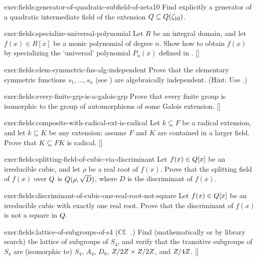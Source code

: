 \begin{exer}{}{exer:fields:generator-of-quadratic-subfield-of-zeta10}
  Find explicitly a generator of a quadratic intermediate field of the
  extension $Q \subseteq Q(\zeta_{10})$.
\end{exer}
\begin{exer}{}{exer:fields:specialize-universal-polynomial}
  Let $R$ be an integral domain, and let $f(x) \in R[x]$ be a monic
  polynomial of degree $n$. Show how to obtain $f(x)$ by specializing
  the `universal' polynomial $P_n(x)$ defined in
  . []
\end{exer}
\begin{exer}{}{exer:fields:elem-symmetric-fns-alg-independent}
  Prove that the elementary symmetric functions $s_1, \dots, s_n$ (see
  )
  are algebraically independent. (Hint: Use
  .)
\end{exer}
\begin{exer}{}{exer:fields:every-finite-grp-is-a-galois-grp}
  Prove that every finite group is isomorphic to the group of
  automorphisms of some Galois
  extension. []
\end{exer}
\begin{exer}{}{exer:fields:composite-with-radical-ext-is-radical}
  Let $k \subseteq F$ be a radical extension, and let $k \subseteq K$
  be any extension; assume $F$ and $K$ are contained in a larger
  field.  Prove that $K \subseteq FK$ is
  radical. []
\end{exer}
\begin{exer}{}{exer:fields:splitting-field-of-cubic-via-discriminant}
  Let $f(x) \in Q[x]$ be an irreducible cubic, and let $\rho$ be a
  real root of $f(x)$. Prove that the splitting field of $f(x)$ over
  $Q$ is $Q(\rho, \sqrt{D})$, where $D$ is the discriminant of
  $f(x)$.
\end{exer}
\begin{exer}{}{exer:fields:discriminant-of-cubic-one-real-root-not-square}
  Let $f(x) \in Q[x]$ be an irreducible cubic with exactly one real
  root. Prove that the discriminant of $f(x)$ is not a square in $Q$.
\end{exer}
\begin{exer}{}{exer:fields:lattice-of-subgroups-of-s4}
  (Cf.\ .) Find
  (mathematically or by library search) the lattice of subgroups of
  $S_4$, and verify that the transitive subgroups of $S_4$ are
  (isomorphic to) $S_4$, $A_4$, $D_8$, $Z/2Z \times Z/2Z$, and
  $Z/4Z$. []
\end{exer}
